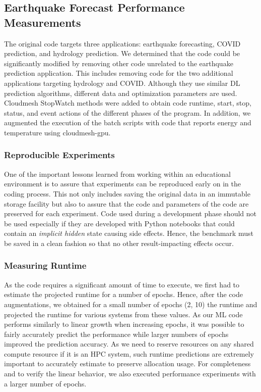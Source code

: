 \documentclass[utf8]{FrontiersinVancouver} %
\begin{document}
\subsection{Earthquake Forecast Performance Measurements}
\label{sec:perf-main}

The original code targets three applications: earthquake forecasting, COVID prediction, and hydrology prediction. We determined that the code could be significantly modified by removing other code unrelated to the earthquake prediction application. This includes removing code for the two additional applications targeting hydrology and COVID. Although  they use similar DL prediction algorithms, different data and optimization parameters are used. Cloudmesh StopWatch methods were added to obtain code runtime, start, stop, status, and event actions of the different phases of the program. In addition, we augmented the execution of the batch scripts with code that reports energy and temperature using cloudmesh-gpu.


\subsubsection{Reproducible Experiments}

One of the important lessons learned from working within an educational environment is to assure that experiments can be reproduced early on in the coding process. This not only includes saving the original data in an immutable storage facility but also to assure that the code and parameters of the code are preserved for each experiment. Code used during a development phase should not be used especially if they are developed with Python notebooks that could contain an {\em implicit
  hidden} state causing side effects. Hence, the benchmark 
must be saved in a clean fashion so that no other result-impacting
effects occur.

\subsubsection{Measuring Runtime}
\label{sec:perf-runtime}

As the code requires a significant amount of time to execute, we first had to estimate the projected runtime for a number of epochs. Hence, after the code augmentations, we obtained for a small number of epochs (2, 10) the runtime and projected the runtime for various systems from these values.  As our ML code performs similarly to linear growth when increasing epochs, it was possible to fairly accurately predict the performance while larger numbers of epochs improved the prediction accuracy. As we need to reserve resources on any shared compute resource if it is an HPC system, such runtime predictions are extremely important to accurately estimate to preserve allocation usage. For completeness and to verify the linear behavior, we also executed performance experiments with a larger number of epochs.
\end{document}
